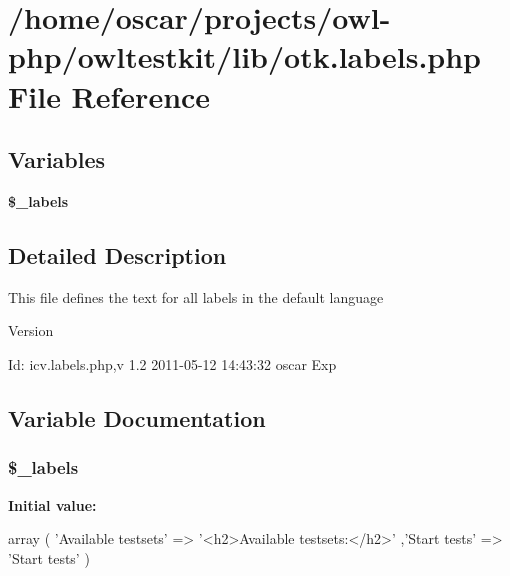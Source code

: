 \section{/home/oscar/projects/owl-\/php/owltestkit/lib/otk.labels.php File Reference}
\label{otk_8labels_8php}
\subsection*{Variables}
\begin{DoxyCompactItemize}
\item 
{\bf \$\_\-labels}
\end{DoxyCompactItemize}


\subsection{Detailed Description}
This file defines the text for all labels in the default language \begin{DoxyVersion}{Version}

\end{DoxyVersion}
\begin{DoxyParagraph}{Id:}
icv.labels.php,v 1.2 2011-\/05-\/12 14:43:32 oscar Exp 
\end{DoxyParagraph}


\subsection{Variable Documentation}
\subsubsection[{\$\_\-labels}]{\setlength{\rightskip}{0pt plus 5cm}\$\_\-labels}\label{otk_8labels_8php_a2ec9873ed5b12f5516e61365717fa6c0}
{\bfseries Initial value:}
\begin{DoxyCode}
 array (
         'Available testsets' => '<h2>Available testsets:</h2>'
        ,'Start tests' => 'Start tests'
)
\end{DoxyCode}
